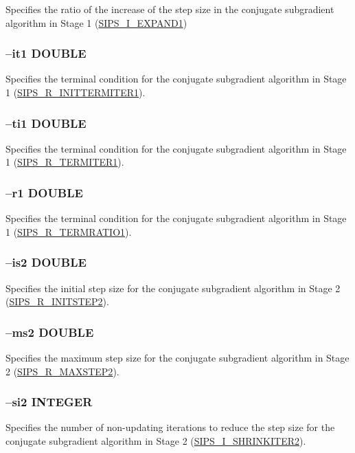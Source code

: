 \documentclass[a4paper]{book}
\begin{document}
Specifies the ratio of the increase of the step size in the conjugate subgradient algorithm in Stage 1
(\hyperlink{EXPAND1}{SIPS\_I\_EXPAND1})

\subsubsection{--it1 DOUBLE}

Specifies the terminal condition for the conjugate subgradient algorithm in Stage 1
(\hyperlink{INITTERMITER1}{SIPS\_R\_INITTERMITER1}).

\subsubsection{--ti1 DOUBLE}

Specifies the terminal condition for the conjugate subgradient algorithm in Stage 1
(\hyperlink{TERMITER1}{SIPS\_R\_TERMITER1}).

\subsubsection{--r1 DOUBLE}

Specifies the terminal condition for the conjugate subgradient algorithm in Stage 1
(\hyperlink{TERMRATIO1}{SIPS\_R\_TERMRATIO1}).

\subsubsection{--is2 DOUBLE}

Specifies the initial step size for the conjugate subgradient algorithm in Stage 2
(\hyperlink{INITSTEP2}{SIPS\_R\_INITSTEP2}).

\subsubsection{--ms2 DOUBLE}

Specifies the maximum step size for the conjugate subgradient algorithm in Stage 2
(\hyperlink{MAXSTEP2}{SIPS\_R\_MAXSTEP2}).

\subsubsection{--si2 INTEGER}

Specifies the number of non-updating iterations  to reduce the step size for the conjugate subgradient algorithm in Stage 2
(\hyperlink{SHRINKITER2}{SIPS\_I\_SHRINKITER2}).
\end{document}
